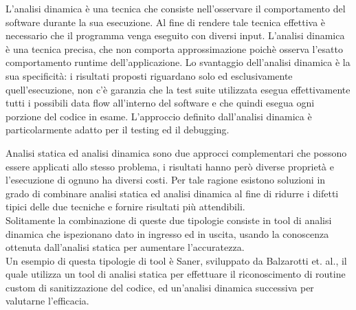 L'analisi dinamica è una tecnica che consiste nell'osservare il comportamento del software durante la sua esecuzione. Al fine di rendere tale tecnica effettiva è necessario che il programma venga eseguito con diversi input. L'analisi dinamica è una tecnica precisa, che non comporta approssimazione poichè osserva l'esatto comportamento runtime dell'applicazione.
Lo svantaggio dell'analisi dinamica è la sua specificità: i risultati proposti riguardano solo ed esclusivamente quell'esecuzione, non c'è garanzia che la test suite utilizzata esegua effettivamente tutti i possibili data flow all'interno del software e che quindi esegua ogni porzione del codice in esame. L'approccio definito dall'analisi dinamica è particolarmente adatto per il testing ed il debugging.

Analisi statica ed analisi dinamica sono due approcci complementari che possono essere applicati allo stesso problema, i risultati hanno però diverse proprietà e l'esecuzione di ognuno ha diversi costi. Per tale ragione esistono soluzioni in grado di combinare analisi statica ed analisi dinamica al fine di ridurre i difetti tipici delle due tecniche e fornire risultati più attendibili.\\
Solitamente la combinazione di queste due tipologie consiste in tool di analisi dinamica che ispezionano dato in ingresso ed in uscita, usando la conoscenza ottenuta dall'analisi statica per aumentare l'accuratezza.\\
Un esempio di questa tipologie di tool è Saner, sviluppato da Balzarotti et. al.\cite{saner}, il quale utilizza un tool di analisi statica per effettuare il riconoscimento di routine custom  di sanitizzazione del codice, ed un'analisi dinamica successiva per valutarne l'efficacia. 
